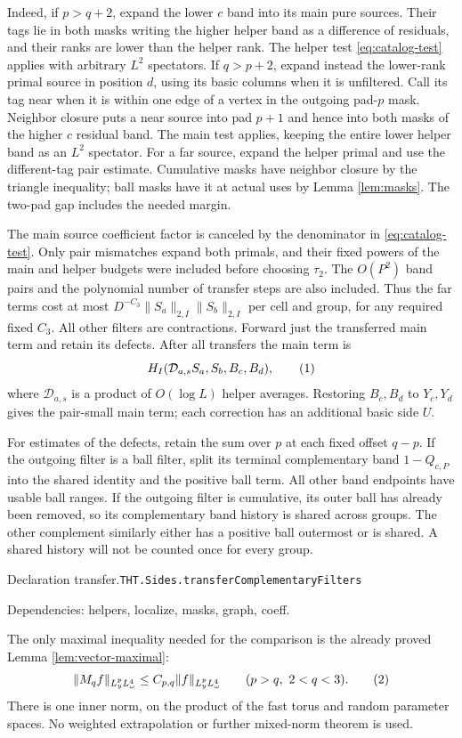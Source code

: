 \documentclass[11pt]{article}
\theoremstyle{definition}
\newcommand{\eqtag}[1]{\refstepcounter{equation}\tag{\theequation}\label{#1}}
\numberwithin{equation}{section}
\newcommand{\bp}[3]{\par\smallskip\begingroup\footnotesize
\noindent\hypertarget{bp:#1}{\textsf{Declaration #1.}}\quad\nolinkurl{#2}\par
\noindent\textsf{Dependencies:} #3.\par\endgroup\smallskip}
\begin{document}
Indeed, if $p>q+2$, expand the lower $c$ band into its main pure sources. Their tags lie in both masks writing the higher helper band as a difference of residuals, and their ranks are lower than the helper rank. The helper test \eqref{eq:catalog-test} applies with arbitrary $L^2$ spectators. If $q>p+2$, expand instead the lower-rank primal source in position $d$, using its basic columns when it is unfiltered. Call its tag near when it is within one edge of a vertex in the outgoing pad-$p$ mask. Neighbor closure puts a near source into pad $p+1$ and hence into both masks of the higher $c$ residual band. The main test applies, keeping the entire lower helper band as an $L^2$ spectator. For a far source, expand the helper primal and use the different-tag pair estimate. Cumulative masks have neighbor closure by the triangle inequality; ball masks have it at actual uses by Lemma \ref{lem:masks}. The two-pad gap includes the needed margin.

The main source coefficient factor is canceled by the denominator in \eqref{eq:catalog-test}. Only pair mismatches expand both primals, and their fixed powers of the main and helper budgets were included before choosing $\tau_2$. The $O(P^2)$ band pairs and the polynomial number of transfer steps are also included. Thus the far terms cost at most $D^{-C_3}\|S_a\|_{2,I}\|S_b\|_{2,I}$ per cell and group, for any required fixed $C_3$. All other filters are contractions. Forward just the transferred main term and retain its defects. After all transfers the main term is
\[
 H_I(\mathcal D_{a,s}S_a,S_b,B_c,B_d),
 \eqtag{eq:transferred-main}
\]
where $\mathcal D_{a,s}$ is a product of $O(\log L)$ helper averages. Restoring $B_c,B_d$ to $Y_c,Y_d$ gives the pair-small main term; each correction has an additional basic side $U$.

For estimates of the defects, retain the sum over $p$ at each fixed offset $q-p$. If the outgoing filter is a ball filter, split its terminal complementary band $1-Q_{c,P}$ into the shared identity and the positive ball term. All other band endpoints have usable ball ranges. If the outgoing filter is cumulative, its outer ball has already been removed, so its complementary band history is shared across groups. The other complement similarly either has a positive ball outermost or is shared. A shared history will not be counted once for every group.

\bp{transfer}{THT.Sides.transferComplementaryFilters}{helpers, localize, masks, graph, coeff}

The only maximal inequality needed for the comparison is the already proved Lemma \ref{lem:vector-maximal}:
\[
 \|M_qf\|_{L_y^pL_\omega^4}\le C_{p,q}\|f\|_{L_y^pL_\omega^4}\qquad(p>q,\ 2<q<3).
 \eqtag{eq:mixed-Mq}
\]
There is one inner norm, on the product of the fast torus and random parameter spaces. No weighted extrapolation or further mixed-norm theorem is used.
\end{document}
